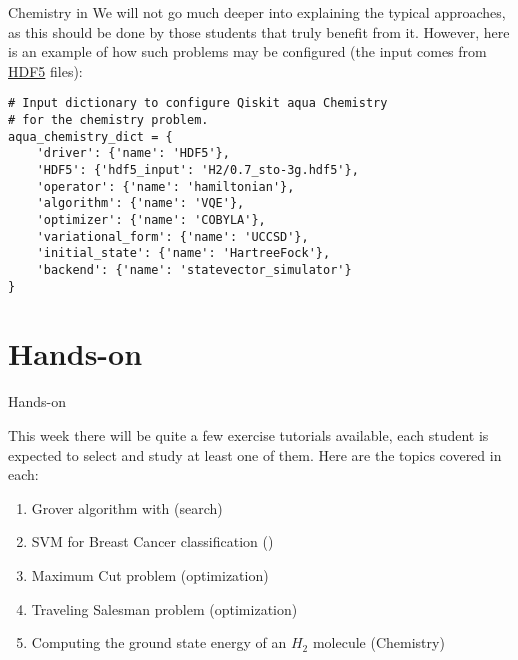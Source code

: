 \documentclass[aspectratio=43]{beamer}
\begin{document}
\begin{frame}[fragile]{Chemistry in \qka}
\small{We will not go much deeper into explaining the typical approaches, as this should be done by those students that truly benefit from it. However, here is an example of how such problems may be configured (the input comes from \href{https://support.hdfgroup.org/HDF5/whatishdf5.html}{HDF5} files):}\begin{verbatim}
# Input dictionary to configure Qiskit aqua Chemistry
# for the chemistry problem.
aqua_chemistry_dict = {
    'driver': {'name': 'HDF5'},
    'HDF5': {'hdf5_input': 'H2/0.7_sto-3g.hdf5'},
    'operator': {'name': 'hamiltonian'},
    'algorithm': {'name': 'VQE'},
    'optimizer': {'name': 'COBYLA'},
    'variational_form': {'name': 'UCCSD'},
    'initial_state': {'name': 'HartreeFock'},
    'backend': {'name': 'statevector_simulator'}
}
\end{verbatim}
\end{frame}


\section{Hands-on}
\begin{frame}{Hands-on}
\begin{card}
    This week there will be quite a few exercise tutorials available, each student is expected to select and study at least one of them. Here are the topics covered in each:
    \begin{enumerate}
        \item Grover algorithm with \qka (search)
        \item SVM for Breast Cancer classification (\ai)
        \item Maximum Cut problem (optimization)
        \item Traveling Salesman problem (optimization)
        \item Computing the ground state energy of an $H_2$ molecule (Chemistry)
    \end{enumerate}
\end{card}
\end{frame}
\end{document}
